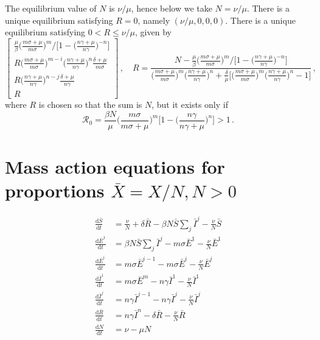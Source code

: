 \documentclass[fleqn]{article}
\begin{document}
The equilibrium value of $N$ is $\nu / \mu$, hence below we take
$N = \nu / \mu$.  There is a unique equilibrium satisfying $R = 0$,
namely $(\nu / \mu, 0, 0, 0)$.  There is a unique equilibrium satisfying
$0 < R \leq \nu / \mu$, given by
\begin{equation}
\begin{bmatrix}
  \frac{\mu}{\beta} \big(\frac{m \sigma + \mu}{m \sigma}\big)^{m} \big/ \big[1 - \big(\frac{n \gamma + \mu}{n \gamma}\big)^{-n}\big] \\
  R \big(\frac{m \sigma + \mu}{m \sigma}\big)^{m - i} \big(\frac{n \gamma + \mu}{n \gamma}\big)^{n} \frac{\delta + \mu}{m \sigma} \\
  R \big(\frac{n \gamma + \mu}{n \gamma}\big)^{n - j} \frac{\delta + \mu}{n \gamma} \\
  R
\end{bmatrix}
\,,\quad
R = \frac{N - \frac{\mu}{\beta} \big(\frac{m \sigma + \mu}{m \sigma}\big)^{m} \big/ \big[1 - \big(\frac{n \gamma + \mu}{n \gamma}\big)^{-n}\big]}{\big(\frac{m \sigma + \mu}{m \sigma}\big)^{m} \big(\frac{n \gamma + \mu}{n \gamma}\big)^{n} + \frac{\delta}{\mu} \big[\big(\frac{m \sigma + \mu}{m \sigma}\big)^{m} \big(\frac{n \gamma + \mu}{n \gamma}\big)^{n} - 1\big]}\,,
\end{equation}
where $R$ is chosen so that the sum is $N$, but it exists only if
\begin{equation}
\mathcal{R}_{0} = \frac{\beta N}{\mu} \Big(\frac{m \sigma}{m \sigma + \mu}\Big)^{m} \Big[1 - \Big(\frac{n \gamma}{n \gamma + \mu}\Big)^{n}\Big] > 1\,.
\end{equation}
\clearpage


\section{Mass action equations for proportions $\bar{X} = X/N, N > 0$}

\begin{subequations}
\begin{align}
  \frac{\text{d} \bar{S}    }{\text{d} t}
  &= \frac{\nu}{N} + \delta \bar{R} - \beta N \bar{S} \sum\nolimits_{j} \bar{I}^{j} - \frac{\nu}{N} \bar{S} \\
  \frac{\text{d} \bar{E}^{1}}{\text{d} t}
  &= \beta N \bar{S} \sum\nolimits_{j} \bar{I}^{j} - m \sigma \bar{E}^{1} - \frac{\nu}{N} \bar{E}^{1} \\
  \frac{\text{d} \bar{E}^{i}}{\text{d} t}
  &= m \sigma \bar{E}^{i-1} - m \sigma \bar{E}^{i} - \frac{\nu}{N} \bar{E}^{i} \\
  \frac{\text{d} \bar{I}^{1}}{\text{d} t}
  &= m \sigma \bar{E}^{m} - n \gamma \bar{I}^{1} - \frac{\nu}{N} \bar{I}^{1} \\
  \frac{\text{d} \bar{I}^{j}}{\text{d} t}
  &= n \gamma \bar{I}^{j-1} - n \gamma \bar{I}^{j} - \frac{\nu}{N} \bar{I}^{j} \\
  \frac{\text{d} \bar{R}    }{\text{d} t}
  &= n \gamma \bar{I}^{n} - \delta \bar{R} - \frac{\nu}{N} \bar{R} \\
  \frac{\text{d}      N     }{\text{d} t}
  &= \nu - \mu N
\end{align}
\end{subequations}
\end{document}
